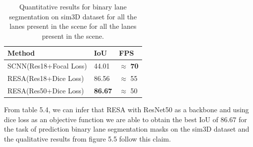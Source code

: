            \begin{table}[h]
    \caption{Quantitative results for binary lane segmentation on sim3D dataset \cite{guo2020gen} for all the lanes present in the scene for all the lanes present in the scene.}
    \centering
    \begin{tabular}{|l|l|l|}
    \hline
        \textbf{Method} & \textbf{IoU} & \textbf{FPS} \\ \hline
        SCNN(Res18+Focal Loss) \cite{pan2018SCNN}& 44.01 & $\approx$ \textbf{70} \\\hline
        RESA(Res18+Dice Loss) \cite{DBLP:journals/corr/abs-2008-13719}& 86.56 & $\approx$ 55 \\\hline
        RESA(Res50+Dice Loss) \cite{DBLP:journals/corr/abs-2008-13719}& \textbf{86.67} & $\approx$ 50 \\\hline
    \end{tabular}
\end{table}
From table 5.4, we can infer that RESA \cite{DBLP:journals/corr/abs-2008-13719} with ResNet50 as a backbone and using dice loss as an objective function we are able to obtain the best IoU of $86.67$ for the task of prediction binary lane segmentation masks on the sim3D dataset \cite{guo2020gen} and the qualitative results from figure 5.5 follow this claim. 
